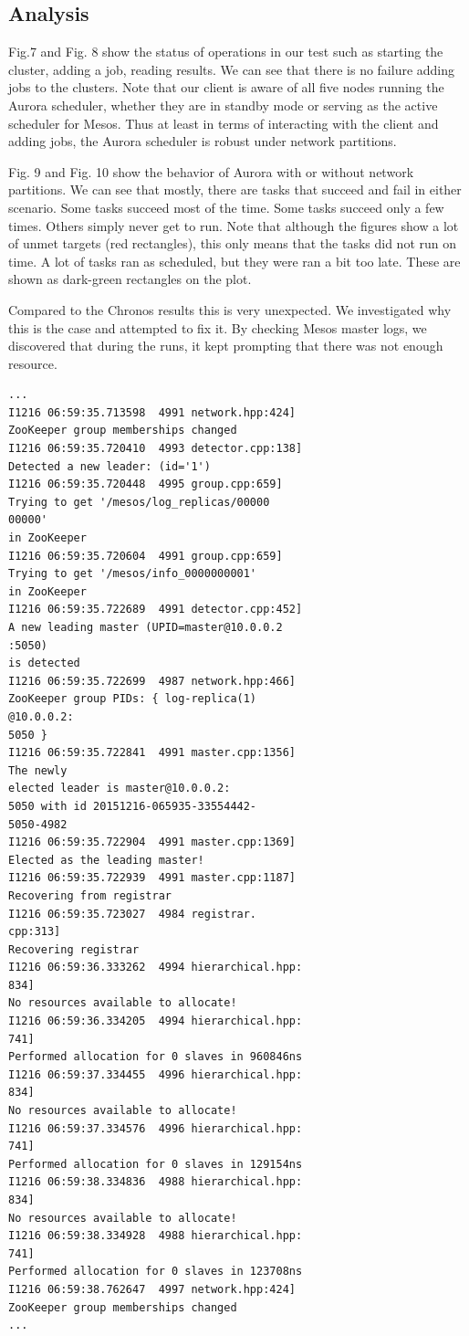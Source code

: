 \documentclass[letterpaper,twocolumn,10pt]{article}
\begin{document}
\subsection{Analysis}
Fig.7 and Fig. 8 show the status of operations in our test such as starting the cluster, adding a job, reading results. We can see that there is no failure adding jobs to the clusters. Note that our client is aware of all five nodes running the Aurora scheduler, whether they are in standby mode or serving as the active scheduler for Mesos. Thus at least in terms of interacting with the client and adding jobs, the Aurora scheduler is robust under network partitions. 

Fig. 9 and Fig. 10 show the behavior of Aurora with or without network partitions. We can see that mostly, there are tasks that succeed and fail in either scenario. Some tasks succeed most of the time. Some tasks succeed only a few times. Others simply never get to run. Note that although the figures show a lot of unmet targets (red rectangles), this only means that the tasks did not run on time. A lot of tasks ran as scheduled, but they were ran a bit too late. These are shown as dark-green rectangles on the plot.

Compared to the Chronos results this is very unexpected. We investigated why this is the case and attempted to fix it. By checking Mesos master logs, we discovered that during the runs, it kept prompting that there was not enough resource.

\begin{verbatim}
...
I1216 06:59:35.713598  4991 network.hpp:424]
ZooKeeper group memberships changed
I1216 06:59:35.720410  4993 detector.cpp:138] 
Detected a new leader: (id='1')
I1216 06:59:35.720448  4995 group.cpp:659]
Trying to get '/mesos/log_replicas/00000
00000'
in ZooKeeper
I1216 06:59:35.720604  4991 group.cpp:659]
Trying to get '/mesos/info_0000000001'
in ZooKeeper
I1216 06:59:35.722689  4991 detector.cpp:452] 
A new leading master (UPID=master@10.0.0.2
:5050)
is detected
I1216 06:59:35.722699  4987 network.hpp:466]
ZooKeeper group PIDs: { log-replica(1)
@10.0.0.2:
5050 }
I1216 06:59:35.722841  4991 master.cpp:1356]
The newly 
elected leader is master@10.0.0.2:
5050 with id 20151216-065935-33554442-
5050-4982
I1216 06:59:35.722904  4991 master.cpp:1369]
Elected as the leading master!
I1216 06:59:35.722939  4991 master.cpp:1187]
Recovering from registrar
I1216 06:59:35.723027  4984 registrar.
cpp:313] 
Recovering registrar
I1216 06:59:36.333262  4994 hierarchical.hpp:
834]
No resources available to allocate!
I1216 06:59:36.334205  4994 hierarchical.hpp:
741] 
Performed allocation for 0 slaves in 960846ns
I1216 06:59:37.334455  4996 hierarchical.hpp:
834] 
No resources available to allocate!
I1216 06:59:37.334576  4996 hierarchical.hpp:
741]
Performed allocation for 0 slaves in 129154ns
I1216 06:59:38.334836  4988 hierarchical.hpp:
834]
No resources available to allocate!
I1216 06:59:38.334928  4988 hierarchical.hpp:
741] 
Performed allocation for 0 slaves in 123708ns
I1216 06:59:38.762647  4997 network.hpp:424]
ZooKeeper group memberships changed
...
\end{verbatim}
\end{document}
